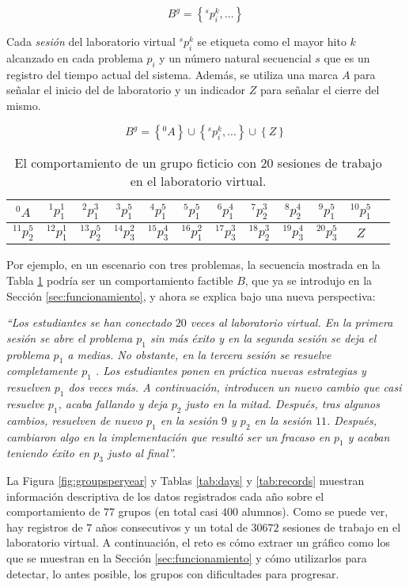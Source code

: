 \begin{equation}
B^g = \left\lbrace ^sp_i^k,\dots \right\rbrace
\end{equation}

Cada \emph{sesión} del laboratorio virtual $^sp_i^k$ se etiqueta como el mayor hito $k$ alcanzado en cada problema $p_i$ y un número natural secuencial $s$ que es un registro del tiempo actual del sistema. Además, se utiliza una marca $A$ para señalar el inicio del de laboratorio y un indicador $Z$ para señalar el cierre del mismo.

\begin{equation}
B^g = \left\lbrace ^0A \right\rbrace \cup \left\lbrace ^sp_i^k,\dots \right\rbrace \cup \left\lbrace Z \right\rbrace
\end{equation}

\begin{table}[H]
\centering
\caption{El comportamiento de un grupo ficticio con $20$ sesiones de trabajo en el laboratorio virtual.}
\label{tab:sequence}
\begin{tabular}{cccccccccccc}
$^0A$ & $^1p_1^1$ & $^2p_1^3$ & $^3p_1^5$ & $^4p_1^5$ & $^5p_1^5$ & $^6p_1^4$ & $^7p_2^3$ & $^8p_2^4$ & $^9p_1^5$ & $^{10}p_1^5$ \\ \hline
$^{11}p_2^5$  & $^{12}p_1^1$ & $^{13}p_2^5$ & $^{14}p_3^2$ & $^{15}p_3^4$ & $^{16}p_1^2$ & $^{17}p_3^3$ & $^{18}p_2^3$ & $^{19}p_3^4$ & $^{20}p_3^5$ & $Z$
\end{tabular}
\end{table}

Por ejemplo, en un escenario con tres problemas, la secuencia mostrada en la Tabla \ref{tab:sequence} podría ser un comportamiento factible $B$, que ya se introdujo en la Sección \ref{sec:funcionamiento}, y ahora se explica bajo una nueva perspectiva:

\emph{``Los estudiantes se han conectado $20$ veces al laboratorio virtual. En la primera sesión se abre el problema $p_1$ sin más éxito y en la segunda sesión se deja el problema $p_1$ a medias. No obstante, en la tercera sesión se resuelve completamente $p_1$ . Los estudiantes ponen en práctica nuevas estrategias y resuelven $p_1$ dos veces más. A continuación, introducen un nuevo cambio que casi resuelve $p_1$, acaba fallando y deja $p_2$ justo en la mitad. Después, tras algunos cambios, resuelven de nuevo $p_1$ en la sesión $9$ y $p_2$ en la sesión $11$. Después, cambiaron algo en la implementación que resultó ser un fracaso en $p_1$ y acaban teniendo éxito en $p_3$ justo al final''.}

La Figura \ref{fig:groupsperyear} y Tablas \ref{tab:days} y \ref{tab:records} muestran información descriptiva de los datos registrados cada año sobre el comportamiento de $77$ grupos (en total casi $400$ alumnos). Como se puede ver, hay registros de $7$ años consecutivos y un total de $30672$ sesiones de trabajo en el laboratorio virtual. A continuación, el reto es cómo extraer un gráfico como los que se muestran en la Sección \ref{sec:funcionamiento} y cómo utilizarlos para detectar, lo antes posible, los grupos con dificultades para progresar.